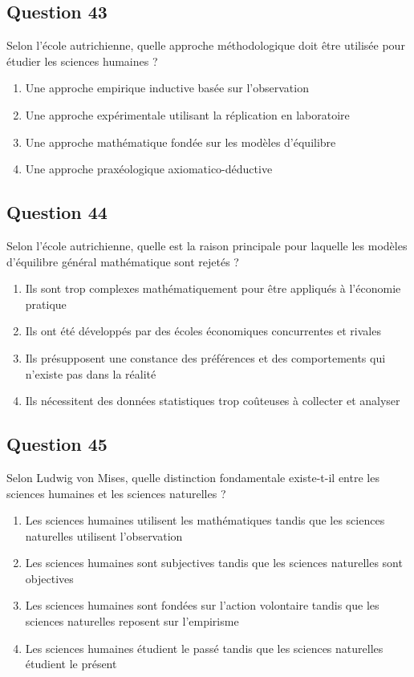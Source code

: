 \documentclass[12pt,a4paper]{article}
\begin{document}
\bigskip


\subsection*{Question 43}
Selon l'école autrichienne, quelle approche méthodologique doit être utilisée pour étudier les sciences humaines ?

\begin{enumerate}[label=\Alph*., leftmargin=*]
\item Une approche empirique inductive basée sur l'observation
\item Une approche expérimentale utilisant la réplication en laboratoire
\item Une approche mathématique fondée sur les modèles d'équilibre
\item Une approche praxéologique axiomatico-déductive
\end{enumerate}

\bigskip


\subsection*{Question 44}
Selon l'école autrichienne, quelle est la raison principale pour laquelle les modèles d'équilibre général mathématique sont rejetés ?

\begin{enumerate}[label=\Alph*., leftmargin=*]
\item Ils sont trop complexes mathématiquement pour être appliqués à l'économie pratique
\item Ils ont été développés par des écoles économiques concurrentes et rivales
\item Ils présupposent une constance des préférences et des comportements qui n'existe pas dans la réalité
\item Ils nécessitent des données statistiques trop coûteuses à collecter et analyser
\end{enumerate}

\bigskip


\subsection*{Question 45}
Selon Ludwig von Mises, quelle distinction fondamentale existe-t-il entre les sciences humaines et les sciences naturelles ?

\begin{enumerate}[label=\Alph*., leftmargin=*]
\item Les sciences humaines utilisent les mathématiques tandis que les sciences naturelles utilisent l'observation
\item Les sciences humaines sont subjectives tandis que les sciences naturelles sont objectives
\item Les sciences humaines sont fondées sur l'action volontaire tandis que les sciences naturelles reposent sur l'empirisme
\item Les sciences humaines étudient le passé tandis que les sciences naturelles étudient le présent
\end{enumerate}
\end{document}

